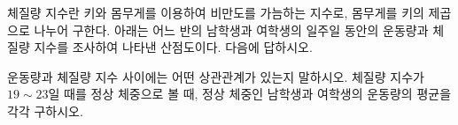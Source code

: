 체질량 지수란 키와 몸무게를 이용하여 비만도를 가늠하는 지수로, 몸무게를 키의 제곱으로 나누어 구한다. 아래는 어느 반의 남학생과 여학생의 일주일 동안의 운동량과 체질량 지수를 조사하여 나타낸 산점도이다. 다음에 답하시오. 
\par\smallskip\begin{center}\resizebox{\ifdim\width>\linewidth\linewidth\else\width\fi}{!}{}\end{center}
 운동량과 체질량 지수 사이에는 어떤 상관관계가 있는지 말하시오.
 체질량 지수가 $19{\sim}23$일 때를 정상 체중으로 볼 때, 정상 체중인 남학생과 여학생의 운동량의 평균을 각각 구하시오.
